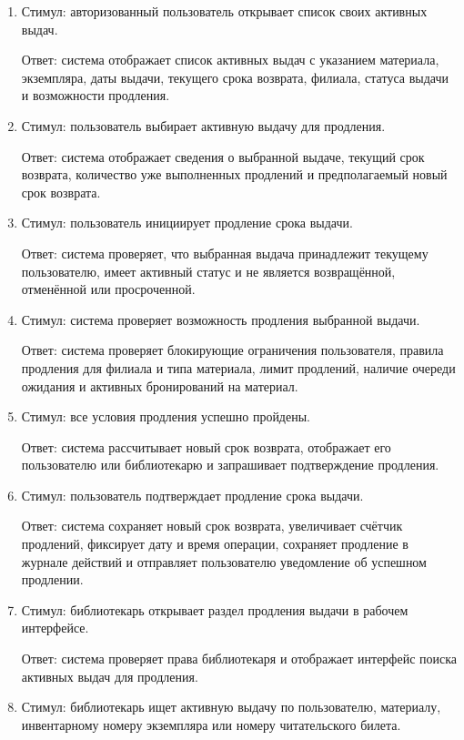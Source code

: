\documentclass[12pt,a4paper]{article}
\begin{document}
	\begin{enumerate}
		\item Стимул: авторизованный пользователь открывает список своих активных
		выдач.
		
		Ответ: система отображает список активных выдач с указанием материала,
		экземпляра, даты выдачи, текущего срока возврата, филиала, статуса выдачи
		и возможности продления.
		
		\item Стимул: пользователь выбирает активную выдачу для продления.
		
		Ответ: система отображает сведения о выбранной выдаче, текущий срок возврата,
		количество уже выполненных продлений и предполагаемый новый срок возврата.
		
		\item Стимул: пользователь инициирует продление срока выдачи.
		
		Ответ: система проверяет, что выбранная выдача принадлежит текущему
		пользователю, имеет активный статус и не является возвращённой, отменённой
		или просроченной.
		
		\item Стимул: система проверяет возможность продления выбранной выдачи.
		
		Ответ: система проверяет блокирующие ограничения пользователя, правила
		продления для филиала и типа материала, лимит продлений, наличие очереди
		ожидания и активных бронирований на материал.
		
		\item Стимул: все условия продления успешно пройдены.
		
		Ответ: система рассчитывает новый срок возврата, отображает его пользователю
		или библиотекарю и запрашивает подтверждение продления.
		
		\item Стимул: пользователь подтверждает продление срока выдачи.
		
		Ответ: система сохраняет новый срок возврата, увеличивает счётчик продлений,
		фиксирует дату и время операции, сохраняет продление в журнале действий
		и отправляет пользователю уведомление об успешном продлении.
		
		\item Стимул: библиотекарь открывает раздел продления выдачи в рабочем интерфейсе.
		
		Ответ: система проверяет права библиотекаря и отображает интерфейс поиска
		активных выдач для продления.
		
		\item Стимул: библиотекарь ищет активную выдачу по пользователю, материалу,
		инвентарному номеру экземпляра или номеру читательского билета.
		

\end{enumerate}
\end{document}
